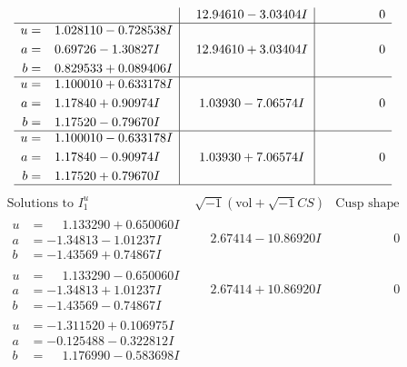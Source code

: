 \documentclass[1p]{elsarticle_modified}
\theoremstyle{definition}
\newcommand{\I}{\sqrt{-1}}
\begin{document}
$$\begin{array}{c|c|c}
 & \phantom{-}12.94610 - 3.03404 I & \phantom{-0.000000 } 0 \\ \hline\begin{aligned}
u &= \phantom{-}1.028110 - 0.728538 I \\
a &= \phantom{-}0.69726 - 1.30827 I \\
b &= \phantom{-}0.829533 + 0.089406 I\end{aligned}
 & \phantom{-}12.94610 + 3.03404 I & \phantom{-0.000000 } 0 \\ \hline\begin{aligned}
u &= \phantom{-}1.100010 + 0.633178 I \\
a &= \phantom{-}1.17840 + 0.90974 I \\
b &= \phantom{-}1.17520 - 0.79670 I\end{aligned}
 & \phantom{-}1.03930 - 7.06574 I & \phantom{-0.000000 } 0 \\ \hline\begin{aligned}
u &= \phantom{-}1.100010 - 0.633178 I \\
a &= \phantom{-}1.17840 - 0.90974 I \\
b &= \phantom{-}1.17520 + 0.79670 I\end{aligned}
 & \phantom{-}1.03930 + 7.06574 I & \phantom{-0.000000 } 0\\
 \hline 
 \end{array}$$\newpage$$\begin{array}{c|c|c}  
\text{Solutions to }I^u_{1}& \I (\text{vol} + \sqrt{-1}CS) & \text{Cusp shape}\\
 \hline 
\begin{aligned}
u &= \phantom{-}1.133290 + 0.650060 I \\
a &= -1.34813 - 1.01237 I \\
b &= -1.43569 + 0.74867 I\end{aligned}
 & \phantom{-}2.67414 - 10.86920 I & \phantom{-0.000000 } 0 \\ \hline\begin{aligned}
u &= \phantom{-}1.133290 - 0.650060 I \\
a &= -1.34813 + 1.01237 I \\
b &= -1.43569 - 0.74867 I\end{aligned}
 & \phantom{-}2.67414 + 10.86920 I & \phantom{-0.000000 } 0 \\ \hline\begin{aligned}
u &= -1.311520 + 0.106975 I \\
a &= -0.125488 - 0.322812 I \\
b &= \phantom{-}1.176990 - 0.583698 I\end{aligned}

\end{array}$$
\end{document}
